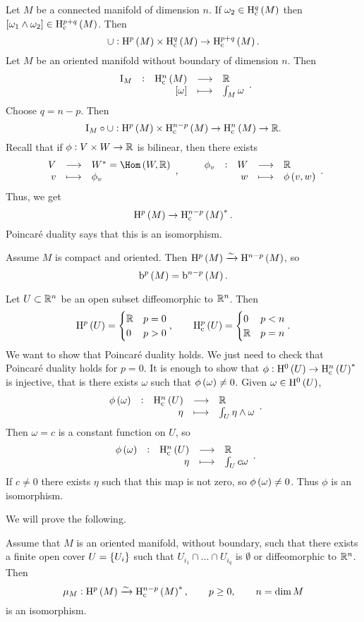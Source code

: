 
Let $ M $ be a connected manifold of dimension $ n $. If $ \omega_2 \in \H_\c^q\br{M} $ then $ \sbr{\omega_1 \wedge \omega_2} \in \H_\c^{p + q}\br{M} $. Then
$$ \cup : \H^p\br{M} \times \H_\c^q\br{M} \to \H_\c^{p + q}\br{M}. $$
Let $ M $ be an oriented manifold without boundary of dimension $ n $. Then
$$ \function[\I_M]{\H_\c^n\br{M}}{\RR}{\sbr{\omega}}{\int_M \omega}. $$
Choose $ q = n - p $. Then
$$ \I_M \circ \cup : \H^p\br{M} \times \H_\c^{n - p}\br{M} \to \H_\c^n\br{M} \to \RR. $$
Recall that if $ \phi : V \times W \to \mathbb{R} $ is bilinear, then there exists
$$ \function{V}{W^* = \Hom\br{W, \RR}}{v}{\phi_v}, \qquad \function[\phi_v]{W}{\RR}{w}{\phi\br{v, w}}. $$
Thus, we get
$$ \H^p\br{M} \to \H_\c^{n - p}\br{M}^*. $$
Poincar\'e duality says that this is an isomorphism.

\begin{example*}
Assume $ M $ is compact and oriented. Then $ \H^p\br{M} \xrightarrow{\sim} \H^{n - p}\br{M} $, so
$$ \b^p\br{M} = \b^{n - p}\br{M}. $$
\end{example*}

\begin{example}
Let $ U \subset \mathbb{R}^n $ be an open subset diffeomorphic to $ \mathbb{R}^n $. Then
$$ \H^p\br{U} =
\begin{cases}
\RR & p = 0 \\
0 & p > 0
\end{cases},
\qquad \H_\c^p\br{U} =
\begin{cases}
0 & p < n \\
\RR & p = n
\end{cases}.
$$
We want to show that Poincar\'e duality holds. We just need to check that Poincar\'e duality holds for $ p = 0 $. It is enough to show that $ \phi : \H^0\br{U} \to \H_\c^n\br{U}^* $ is injective, that is there exists $ \omega $ such that $ \phi\br{\omega} \ne 0 $. Given $ \omega \in \H^0\br{U} $,
$$ \function[\phi\br{\omega}]{\H_\c^n\br{U}}{\RR}{\eta}{\int_U \eta \wedge \omega}. $$
Then $ \omega = c $ is a constant function on $ U $, so
$$ \function[\phi\br{\omega}]{\H_\c^n\br{U}}{\RR}{\eta}{\int_U c\omega}. $$
If $ c \ne 0 $ there exists $ \eta $ such that this map is not zero, so $ \phi\br{\omega} \ne 0 $. Thus $ \phi $ is an isomorphism.
\end{example}

\pagebreak

We will prove the following.

\begin{theorem}
\label{thm:2.52}
Assume that $ M $ is an oriented manifold, without boundary, such that there exists a finite open cover $ U = \cbr{U_i} $ such that $ U_{i_1} \cap \dots \cap U_{i_q} $ is $ \emptyset $ or diffeomorphic to $ \mathbb{R}^n $. Then
$$ \mu_M : \H^p\br{M} \xrightarrow{\sim} \H_\c^{n - p}\br{M}^*, \qquad p \ge 0, \qquad n = \dim M $$
is an isomorphism.
\end{theorem}

